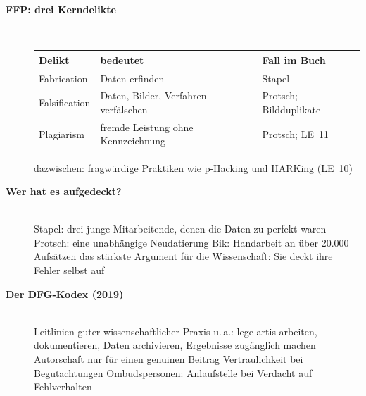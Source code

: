 \begin{description}
\item[{\rot\bf FFP: drei Kerndelikte}]~\\[-\lblskip]
\begin{center}\nsl{\small}
\begin{tabular}{p{}p{}p{}}
\toprule
\textbf{Delikt} & \textbf{bedeutet} & \textbf{Fall im Buch} \\
\midrule
Fabrication & Daten erfinden & Stapel \parencite{levelt2012flawed} \\
Falsification & Daten, Bilder, Verfahren verfälschen & Protsch; Bildduplikate \parencite{bik2016prevalence} \\
Plagiarism & fremde Leistung ohne Kennzeichnung & Protsch; LE~11 \\
\bottomrule
\end{tabular}
\end{center}
\bi
  \ite dazwischen: fragwürdige Praktiken wie p-Hacking und HARKing (LE~10)
\ei
\os{\newpage}

\item[{\rot\bf Wer hat es aufgedeckt?}]~\\[-\lblskip]
\bi
  \ite Stapel: drei junge Mitarbeitende, denen die Daten zu perfekt waren
  \ite Protsch: eine unabhängige Neudatierung
  \ite Bik: Handarbeit an über 20.000 Aufsätzen
    \parencite{bik2016prevalence}
  \ite das stärkste Argument für die Wissenschaft: Sie deckt ihre Fehler
    selbst auf
\ei
\os{\newpage}

\item[{\rot\bf Der DFG-Kodex (2019)}]~\\[-\lblskip]
\bi
   Leitlinien guter wissenschaftlicher Praxis
  \ite u.\,a.: lege artis arbeiten, dokumentieren, Daten archivieren,
    Ergebnisse zugänglich machen
  \ite Autorschaft nur für einen genuinen Beitrag
  \ite Vertraulichkeit bei Begutachtungen
  \ite Ombudspersonen: Anlaufstelle bei Verdacht auf Fehlverhalten
\ei
\os{\newpage}
\end{description}

